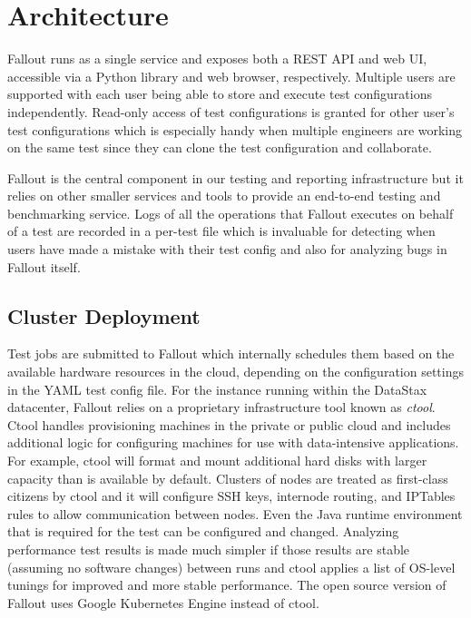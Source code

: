 \documentclass[a4paper,fleqn]{cas-dc}
\begin{document}
\section{Architecture}\label{architecture}

Fallout runs as a single service and exposes both a REST API and web UI, accessible via a Python
library and web browser, respectively. Multiple users are supported with each user being able to
store and execute test configurations independently. Read-only access of test configurations is
granted for other user’s test configurations which is especially handy when multiple
engineers are working on the same test since they can clone the test configuration and
collaborate.

Fallout is the central component in our testing and reporting infrastructure but it relies on other
smaller services and tools to provide an end-to-end testing and benchmarking service. Logs of all
the operations that Fallout executes on behalf of a test are recorded in a per-test file which is
invaluable for detecting when users have made a mistake with their test config and also for
analyzing bugs in Fallout itself.

\subsection{Cluster Deployment}

Test jobs are submitted to Fallout which internally schedules them based on the available hardware
resources in the cloud, depending on the configuration settings in the YAML
test config file. For the instance running within the DataStax datacenter, Fallout relies on a
proprietary infrastructure tool known as \emph{ctool}. Ctool handles provisioning machines in the
private or public cloud and includes additional logic for configuring machines for use with
data-intensive applications. For example, ctool will format and mount additional hard disks with
larger capacity than is available by default. Clusters of nodes are treated as first-class citizens
by ctool and it will configure SSH keys, internode routing, and IPTables rules to allow
communication between nodes. Even the Java runtime environment that is required for the test can be
configured and changed. Analyzing performance test results is made much simpler if those results are
stable (assuming no software changes) between runs and ctool applies a list of OS-level tunings for
improved and more stable performance. The open source version of Fallout uses Google Kubernetes
Engine instead of ctool.
\end{document}
